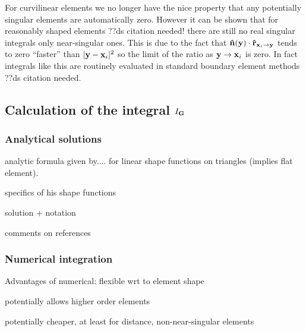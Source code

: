 For curvilinear elements we no longer have the nice property that any potentially singular elements are automatically zero. However it can be shown that for reasonably shaped elements ??ds citation needed! there are still no real singular integrals only near-singular ones. This is due to the fact that $\mathbf{\hat{n}}(\mathbf{y}) \cdot \mathbf{\hat{r}}_{\mathbf{x}_{{i}} \rightarrow \mathbf{y}}$ tends to zero ``faster'' than $\lvert \mathbf{y} - \mathbf{x}_{i} \rvert^2$ so the limit of the ratio as $\mathbf{y} \rightarrow \mathbf{x}_{i}$ is zero. In fact integrals like this are routinely evaluated in standard boundary element methods ??ds citation needed.






\subsection{Calculation of the integral $I_{\mathbf{G}}$}

\subsubsection{Analytical solutions}

analytic formula given by.... for linear shape functions on triangles (implies flat element).

specifics of his shape functions

solution + notation

comments on references


\subsubsection{Numerical integration}

Advantages of numerical: flexible wrt to element shape

potentially allows higher order elements

potentially cheaper, at least for distance, non-near-singular elements



